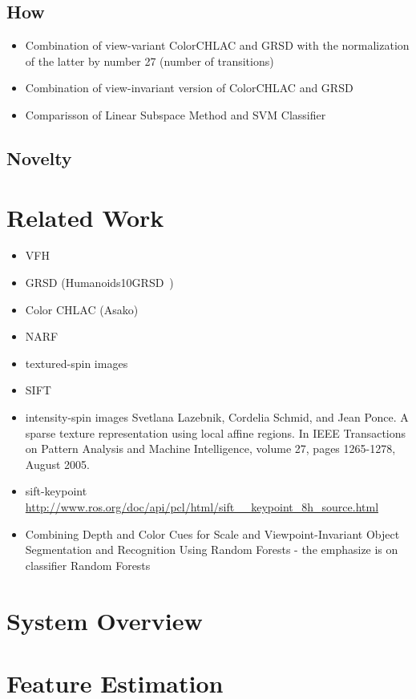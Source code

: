 \documentclass[conference]{sty/IEEEtran}
\begin{document}
\subsection{How}
\begin{itemize}
\item Combination of view-variant ColorCHLAC and GRSD with the
normalization of the latter by number 27 (number of transitions)
\item Combination of view-invariant version of ColorCHLAC and GRSD
\item Comparisson of Linear Subspace Method and SVM Classifier
\end{itemize}

\subsection{Novelty}


\section{Related Work}
\begin{itemize}
\item VFH~\cite{vfh}
\item GRSD (Humanoids10GRSD~)\cite{GRSD10Humanoids}
\item Color CHLAC (Asako)~\cite{kanezaki2010icra}\cite{kanezaki2010tvc}
\item NARF{}
\item textured-spin images
\item SIFT
\item intensity-spin images Svetlana Lazebnik, Cordelia Schmid, and Jean Ponce. 
    A sparse texture representation using local affine regions. 
    In IEEE Transactions on Pattern Analysis and Machine Intelligence, volume 27, pages 1265-1278, August 2005.
\item sift-keypoint \url{http://www.ros.org/doc/api/pcl/html/sift__keypoint_8h_source.html}
\item Combining Depth and Color Cues for Scale and Viewpoint-Invariant
Object Segmentation and Recognition Using Random Forests - the emphasize is on classifier Random Forests
\end{itemize}

\section{System Overview}


\section{Feature Estimation}
\end{document}
